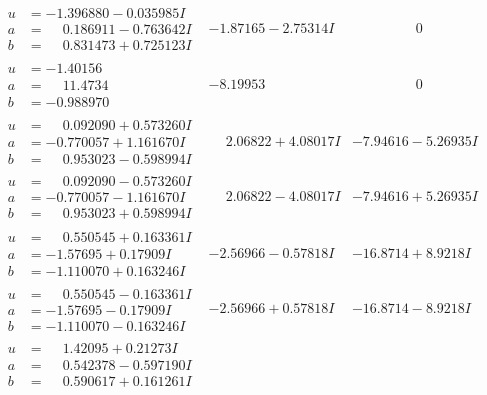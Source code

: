 \documentclass[1p]{elsarticle_modified}
\theoremstyle{definition}
\begin{document}
$$\begin{array}{c|c|c}
\begin{aligned}
u &= -1.396880 - 0.035985 I \\
a &= \phantom{-}0.186911 - 0.763642 I \\
b &= \phantom{-}0.831473 + 0.725123 I\end{aligned}
 & -1.87165 - 2.75314 I & \phantom{-0.000000 } 0 \\ \hline\begin{aligned}
u &= -1.40156\phantom{ +0.000000I} \\
a &= \phantom{-}11.4734\phantom{ +0.000000I} \\
b &= -0.988970\phantom{ +0.000000I}\end{aligned}
 & -8.19953\phantom{ +0.000000I} & \phantom{-0.000000 } 0 \\ \hline\begin{aligned}
u &= \phantom{-}0.092090 + 0.573260 I \\
a &= -0.770057 + 1.161670 I \\
b &= \phantom{-}0.953023 - 0.598994 I\end{aligned}
 & \phantom{-}2.06822 + 4.08017 I & -7.94616 - 5.26935 I \\ \hline\begin{aligned}
u &= \phantom{-}0.092090 - 0.573260 I \\
a &= -0.770057 - 1.161670 I \\
b &= \phantom{-}0.953023 + 0.598994 I\end{aligned}
 & \phantom{-}2.06822 - 4.08017 I & -7.94616 + 5.26935 I \\ \hline\begin{aligned}
u &= \phantom{-}0.550545 + 0.163361 I \\
a &= -1.57695 + 0.17909 I \\
b &= -1.110070 + 0.163246 I\end{aligned}
 & -2.56966 - 0.57818 I & -16.8714 + 8.9218 I \\ \hline\begin{aligned}
u &= \phantom{-}0.550545 - 0.163361 I \\
a &= -1.57695 - 0.17909 I \\
b &= -1.110070 - 0.163246 I\end{aligned}
 & -2.56966 + 0.57818 I & -16.8714 - 8.9218 I \\ \hline\begin{aligned}
u &= \phantom{-}1.42095 + 0.21273 I \\
a &= \phantom{-}0.542378 - 0.597190 I \\
b &= \phantom{-}0.590617 + 0.161261 I\end{aligned}

\end{array}$$
\end{document}
